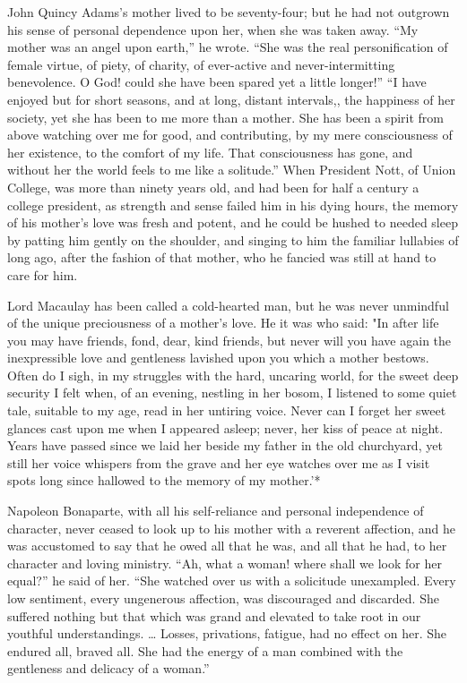 \documentclass[
]{book}
\begin{document}
John Quincy Adams's mother lived to be seventy-four; but he had not outgrown his sense of personal dependence upon her, when she was taken away. ``My mother was an angel upon earth,'' he wrote. ``She was the real personification of female virtue, of piety, of charity, of ever-active and never-intermitting benevolence. O God! could she have been spared yet a little longer!'' ``I have enjoyed but for short seasons, and at long, distant intervals,, the happiness of her society, yet she has been to me more than a mother. She has been a spirit from above watching over me for good, and contributing, by my mere consciousness of her existence, to the comfort of my life. That consciousness has gone, and without her the world feels to me like a solitude.'' When President Nott, of Union College, was more than ninety years old, and had been for half a century a college president, as strength and sense failed him in his dying hours, the memory of his mother's love was fresh and potent, and he could be hushed to needed sleep by patting him gently on the shoulder, and singing to him the familiar lullabies of long ago, after the fashion of that mother, who he fancied was still at hand to care for him.

Lord Macaulay has been called a cold-hearted man, but he was never unmindful of the unique preciousness of a mother's love. He it was who said: "In after life you may have friends, fond, dear, kind friends, but never will you have again the inexpressible love and gentleness lavished upon you which a mother bestows. Often do I sigh, in my struggles with the hard, uncaring world, for the sweet deep security I felt when, of an evening, nestling in her bosom, I listened to some quiet tale, suitable to my age, read in her untiring voice. Never can I forget her sweet glances cast upon me when I appeared asleep; never, her kiss of peace at night. Years have passed since we laid her beside my father in the old churchyard, yet still her voice whispers from the grave and her eye watches over me as I visit spots long since hallowed to the memory of my mother.'*

Napoleon Bonaparte, with all his self-reliance and personal independence of character, never ceased to look up to his mother with a reverent affection, and he was accustomed to say that he owed all that he was, and all that he had, to her character and loving ministry. ``Ah, what a woman! where shall we look for her equal?'' he said of her. ``She watched over us with a solicitude unexampled. Every low sentiment, every ungenerous affection, was discouraged and discarded. She suffered nothing but that which was grand and elevated to take root in our youthful understandings. \ldots{} Losses, privations, fatigue, had no effect on her. She endured all, braved all. She had the energy of a man combined with the gentleness and delicacy of a woman.''
\end{document}
